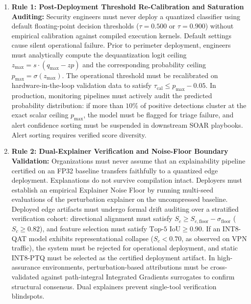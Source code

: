 \documentclass[conference]{IEEEtran}
\begin{document}
\begin{enumerate}
    \item \textbf{Rule 1: Post-Deployment Threshold Re-Calibration and Saturation Auditing:} Security engineers must never deploy a quantized classifier using default floating-point decision thresholds ($\tau = 0.500$ or $\tau = 0.900$) without empirical calibration against compiled execution kernels. Default settings cause silent operational failure. Prior to perimeter deployment, engineers must analytically compute the dequantization logit ceiling $z_{\max} = s \cdot (q_{\max} - zp)$ and the corresponding probability ceiling $p_{\max} = \sigma(z_{\max})$. The operational threshold must be recalibrated on hardware-in-the-loop validation data to satisfy $\tau_{\text{cal}} \le p_{\max} - 0.05$. In production, monitoring pipelines must actively audit the predicted probability distribution: if more than $10\%$ of positive detections cluster at the exact scalar ceiling $p_{\max}$, the model must be flagged for triage failure, and alert confidence sorting must be suspended in downstream SOAR playbooks. Alert sorting requires verified score diversity.
    \item \textbf{Rule 2: Dual-Explainer Verification and Noise-Floor Boundary Validation:} Organizations must never assume that an explainability pipeline certified on an FP32 baseline transfers faithfully to a quantized edge deployment. Explanations do not survive compilation intact. Deployers must establish an empirical Explainer Noise Floor by running multi-seed evaluations of the perturbation explainer on the uncompressed baseline. Deployed edge artifacts must undergo formal drift auditing over a stratified verification cohort: directional alignment must satisfy $S_c \ge S_{c, \text{floor}} - \sigma_{\text{floor}}$ ($S_c \ge 0.82$), and feature selection must satisfy $\text{Top-5 IoU} \ge 0.90$. If an INT8-QAT model exhibits representational collapse ($S_c < 0.70$, as observed on VPN traffic), the system must be rejected for operational deployment, and static INT8-PTQ must be selected as the certified deployment artifact. In high-assurance environments, perturbation-based attributions must be cross-validated against path-integral Integrated Gradients surrogates to confirm structural consensus. Dual explainers prevent single-tool verification blindspots.

\end{enumerate}
\end{document}
